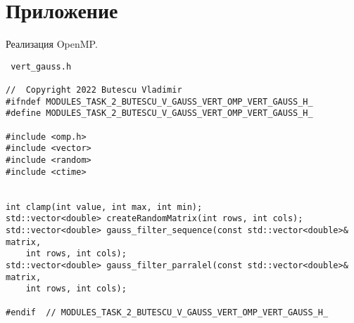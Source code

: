 \documentclass{report}
\begin{document}
\section*{Приложение}
Реализация OpenMP.
\begin{lstlisting}
 vert_gauss.h

//  Copyright 2022 Butescu Vladimir
#ifndef MODULES_TASK_2_BUTESCU_V_GAUSS_VERT_OMP_VERT_GAUSS_H_
#define MODULES_TASK_2_BUTESCU_V_GAUSS_VERT_OMP_VERT_GAUSS_H_

#include <omp.h>
#include <vector>
#include <random>
#include <ctime>


int clamp(int value, int max, int min);
std::vector<double> createRandomMatrix(int rows, int cols);
std::vector<double> gauss_filter_sequence(const std::vector<double>& matrix,
    int rows, int cols);
std::vector<double> gauss_filter_parralel(const std::vector<double>& matrix,
    int rows, int cols);

#endif  // MODULES_TASK_2_BUTESCU_V_GAUSS_VERT_OMP_VERT_GAUSS_H_

\end{lstlisting}
\end{document}
